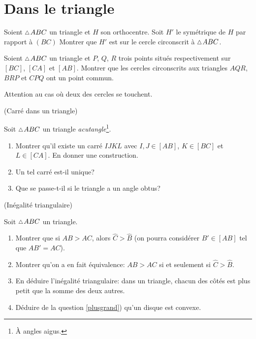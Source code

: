 \documentclass[a4paper,11pt,reqno]{amsart}
\begin{document}
\section{Dans le triangle}

\begin{exo}[.49]

  Soient $\tri ABC$ un triangle et $H$  son orthocentre. Soit $H'$ le symétrique de $H$ par rapport à $(BC)$ Montrer que $H'$ est sur le cercle circonscrit à $\tri ABC$.
\end{exo}

\begin{exo}[.7]

  Soient $\tri ABC$ un triangle et $P$, $Q$, $R$ trois points situés respectivement sur $[BC]$, $[CA]$ et $[AB]$. Montrer que les cercles circonscrits aux triangles $AQR$, $BRP$ et $CPQ$ ont un point commun.\\
  \begin{indication}
    Attention au cas où deux des cercles se touchent.
  \end{indication}
\end{exo}


\begin{exo} (Carré dans un  triangle)

  Soit $\tri ABC$ un triangle \emph{acutangle}\footnote{À angles aigus.}.
  \begin{enumerate}
    \item Montrer qu'il existe un carré $IJKL$ avec $I,J \in [AB]$, $K \in [BC]$ et $L \in [CA]$. En donner une construction.
    \item Un tel carré est-il unique?
    \item Que se passe-t-il si le triangle a un angle obtus?
  \end{enumerate}
\end{exo}

\begin{exo} (Inégalité triangulaire)

  Soit $\tri ABC$ un triangle.
  \begin{enumerate}
    \item \label{plusgrand} Montrer que si $AB > AC$, alors $\widehat{C}>\widehat{B}$ (on pourra considérer $B' \in [AB]$ tel que $AB'=AC$). %
    \item Montrer qu'on a en fait équivalence: $AB>AC$ si et seulement si $\widehat{C}>\widehat{B}$.
    \item En déduire l'inégalité triangulaire: dans un triangle, chacun des côtés est plus petit que la somme des deux autres.
    \item Déduire de la question \ref{plusgrand}) qu'un disque est convexe.
  \end{enumerate}
\end{exo}
\end{document}
